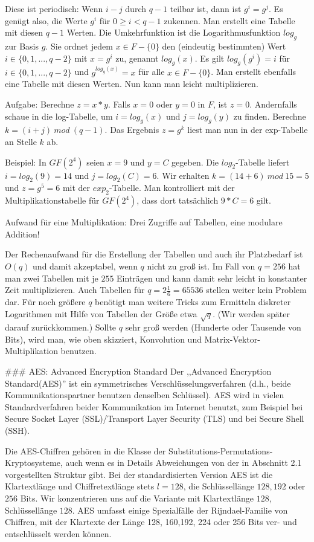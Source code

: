 \documentclass[a4paper]{article}
\begin{document}
\begin{multicols}{3}
Diese ist periodisch: Wenn $i-j$ durch $q-1$ teilbar ist, dann ist $g^i=g^j$. Es genügt also, die Werte $g^i$ für $0\geq i<q-1$ zukennen. Man erstellt eine Tabelle mit diesen $q-1$ Werten.
Die Umkehrfunktion ist die Logarithmusfunktion $log_g$ zur Basis $g$. Sie ordnet jedem $x\in F-\{0\}$ den (eindeutig bestimmten) Wert $i\in\{0,1,...,q-2\}$ mit $x=g^i$ zu, genannt $log_g(x)$. Es gilt $log_g(g^i)=i$ für $i\in\{0,1,...,q-2\}$ und $g^{log_g(x)}=x$ für alle $x\in F-\{0\}$. Man erstellt ebenfalls eine Tabelle mit diesen Werten. 
Nun kann man leicht multiplizieren.

Aufgabe: Berechne $z=x*y$.
Falls $x=0$ oder $y=0$ in $F$, ist $z=0$. Andernfalls schaue in die log-Tabelle, um $i=log_g(x)$ und $j=log_g(y)$ zu finden. Berechne $k=(i+j)\ mod\ (q-1)$. Das Ergebnis $z=g^k$ liest man nun in der exp-Tabelle an Stelle $k$ ab.

Beispiel: In $GF(2^4)$ seien $x=9$ und $y=C$ gegeben. Die $log_2$-Tabelle liefert $i=log_2(9)=14$ und $j=log_2(C)=6$. Wir erhalten $k= (14+6)\ mod\ 15 = 5$ und $z=g^5=6$ mit der $exp_2$-Tabelle. Man kontrolliert mit der Multiplikationstabelle für $GF(2^4)$, dass dort tatsächlich $9*C=6$ gilt.

Aufwand für eine Multiplikation: Drei Zugriffe auf Tabellen, eine modulare Addition!

Der Rechenaufwand für die Erstellung der Tabellen und auch ihr Platzbedarf ist $O(q)$ und damit akzeptabel, wenn $q$ nicht zu groß ist. Im Fall von $q=256$ hat man zwei Tabellen mit je $255$ Einträgen und kann damit sehr leicht in konstanter Zeit multiplizieren. Auch Tabellen für $q=2\frac{1}{6}=65536$ stellen weiter kein Problem dar. Für noch größere $q$ benötigt man weitere Tricks zum Ermitteln diskreter Logarithmen mit Hilfe von Tabellen der Größe etwa $\sqrt{q}$. (Wir werden später darauf zurückkommen.) Sollte $q$ sehr groß werden (Hunderte oder Tausende von Bits), wird man, wie oben skizziert, Konvolution und Matrix-Vektor-Multiplikation benutzen.

### AES: Advanced Encryption Standard
Der ,,Advanced Encryption Standard(AES)'' ist ein symmetrisches Verschlüsselungsverfahren (d.h., beide Kommunikationspartner benutzen denselben Schlüssel). AES wird in vielen Standardverfahren beider Kommunikation im Internet benutzt, zum Beispiel bei Secure Socket Layer (SSL)/Transport Layer Security (TLS) und bei Secure Shell (SSH). 

Die AES-Chiffren gehören in die Klasse der Substitutions-Permutations-Kryptosysteme, auch wenn es in Details Abweichungen von der in Abschnitt 2.1 vorgestellten Struktur gibt. Bei der standardisierten Version AES ist die Klartextlänge und Chiffretextlänge stets $l= 128$, die Schlüssellänge $128,192$ oder $256$ Bits. Wir konzentrieren uns auf die Variante mit Klartextlänge $128$, Schlüssellänge $128$. AES umfasst einige Spezialfälle der Rijndael-Familie von Chiffren, mit der Klartexte der Länge 128, 160,192, 224 oder 256 Bits ver- und entschlüsselt werden können.


\end{multicols}
\end{document}
